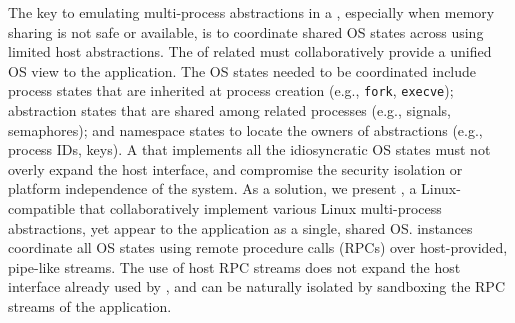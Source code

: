 

The key to emulating multi-process abstractions in a \libos{},
especially when memory sharing is not safe or available,
is to coordinate shared OS states
across \picoprocs{} using limited host abstractions.
The \libos{} of related \picoprocs{} %
must collaboratively provide a unified OS view
to the application.
The OS states needed to be coordinated
include process states that are inherited at process creation
(e.g., {\tt fork}, {\tt execve});
abstraction states that are shared among related processes
(e.g., signals, \sysvipc{} semaphores);
and namespace states to locate the owners of abstractions
(e.g., process IDs, \sysvipc{} keys).
A \libos{} that implements all the idiosyncratic OS states
must not overly expand the host interface,
and compromise the security isolation or platform independence of the system.
As a solution, we present \term{\graphene{}},
a Linux-compatible \libos{} that collaboratively implement
various Linux multi-process abstractions,
yet appear to the application as a single, shared OS.
\graphene{} instances coordinate all OS states using remote procedure calls (RPCs) over
host-provided, pipe-like streams.
The use of host RPC streams
does not expand the host interface already used by \graphene{},
and can be naturally isolated
by sandboxing the RPC streams of the application.





